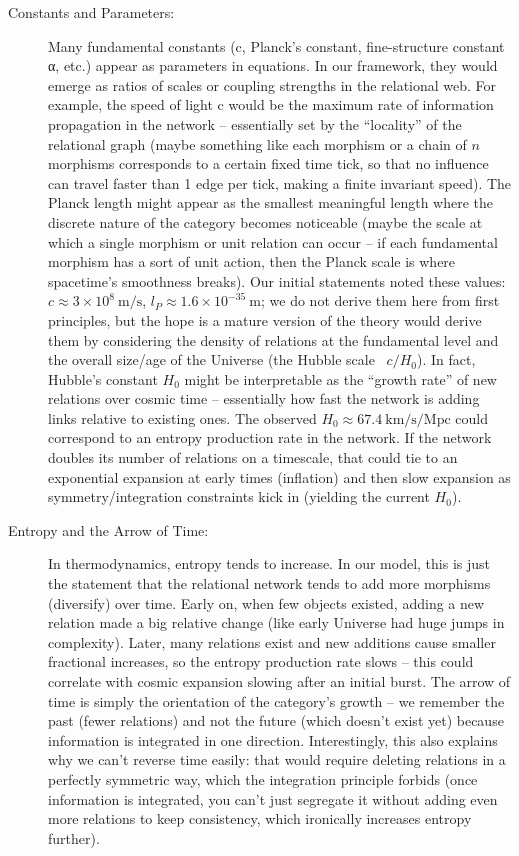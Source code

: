\documentclass{article}
\begin{document}
\begin{description}
\item[Constants and Parameters:] Many fundamental constants (c, Planck’s constant, fine-structure constant α, etc.) appear as parameters in equations. In our framework, they would emerge as ratios of scales or coupling strengths in the relational web. For example, the speed of light c would be the maximum rate of information propagation in the network – essentially set by the “locality” of the relational graph (maybe something like each morphism or a chain of $n$ morphisms corresponds to a certain fixed time tick, so that no influence can travel faster than 1 edge per tick, making a finite invariant speed). The Planck length might appear as the smallest meaningful length where the discrete nature of the category becomes noticeable (maybe the scale at which a single morphism or unit relation can occur – if each fundamental morphism has a sort of unit action, then the Planck scale is where spacetime’s smoothness breaks). Our initial statements noted these values: $c \approx 3\times10^8\ \text{m/s}$, $l_P \approx 1.6\times10^{-35}\ \text{m}$; we do not derive them here from first principles, but the hope is a mature version of the theory would derive them by considering the density of relations at the fundamental level and the overall size/age of the Universe (the Hubble scale ~$c/H_0$). In fact, Hubble’s constant $H_0$ might be interpretable as the “growth rate” of new relations over cosmic time – essentially how fast the network is adding links relative to existing ones. The observed $H_0 \approx 67.4\ \text{km/s/Mpc}$ could correspond to an entropy production rate in the network. If the network doubles its number of relations on a timescale, that could tie to an exponential expansion at early times (inflation) and then slow expansion as symmetry/integration constraints kick in (yielding the current $H_0$).

\item[Entropy and the Arrow of Time:] In thermodynamics, entropy tends to increase. In our model, this is just the statement that the relational network tends to add more morphisms (diversify) over time. Early on, when few objects existed, adding a new relation made a big relative change (like early Universe had huge jumps in complexity). Later, many relations exist and new additions cause smaller fractional increases, so the entropy production rate slows – this could correlate with cosmic expansion slowing after an initial burst. The arrow of time is simply the orientation of the category’s growth – we remember the past (fewer relations) and not the future (which doesn’t exist yet) because information is integrated in one direction. Interestingly, this also explains why we can’t reverse time easily: that would require deleting relations in a perfectly symmetric way, which the integration principle forbids (once information is integrated, you can’t just segregate it without adding even more relations to keep consistency, which ironically increases entropy further).
\end{description}
\end{document}
